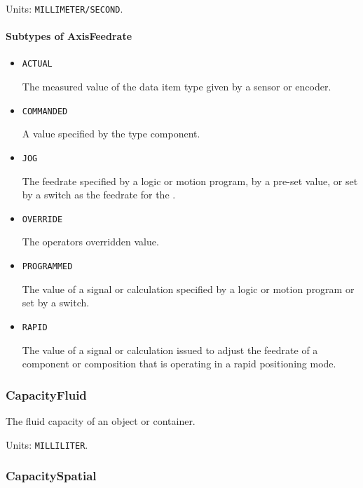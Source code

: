 Units: \texttt{MILLIMETER/SECOND}.

\paragraph{Subtypes of AxisFeedrate}\mbox{}
\label{sec:Subtypes of AxisFeedrate}

\begin{itemize}

\item \texttt{ACTUAL}


The measured value of the data item type given by a sensor or encoder.

\item \texttt{COMMANDED}


A value specified by the  type component.

\item \texttt{JOG}


The feedrate specified by a logic or motion program, by a pre-set value, or set by a switch as the feedrate for the . 

\item \texttt{OVERRIDE}


The operators overridden value.

\item \texttt{PROGRAMMED}


The value of a signal or calculation specified by a logic or motion program or set by a switch.

\item \texttt{RAPID}


The value of a signal or calculation issued to adjust the feedrate of a component or composition that is operating in a rapid positioning mode.


\end{itemize}

\subsubsection{CapacityFluid}
\label{sec:CapacityFluid}



The fluid capacity of an object or container.


Units: \texttt{MILLILITER}.

\subsubsection{CapacitySpatial}
\label{sec:CapacitySpatial}



